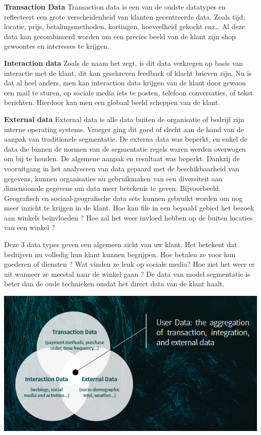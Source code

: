 \textbf{Transaction Data} \newline
Transaction data is een van de oudste datatypes en reflecteert een grote verscheidenheid van klanten gecentreerde data. Zoals tijd, locatie, prijs, betalingsmethoden, kortingen, hoeveelheid gekocht enz… Al deze data kan gecombineerd worden om een precies beeld van de klant zijn shop gewoontes en interesses te krijgen.

\textbf{Interaction data} \newline
Zoals de naam het zegt, is dit data verkregen op basis van interactie met de klant, dit kan geschreven feedback of klacht brieven zijn. Nu is dat al heel anders, men kan interaction data krijgen van de klant door gewoon een mail te sturen, op sociale media iets te posten, telefoon conversaties, of tekst berichten. Hierdoor kan men een globaal beeld scheppen van de klant.

\textbf{External data}
External data is alle data buiten de organisatie of bedrijf zijn interne operating systems. Vroeger ging dit goed of slecht aan de hand van de aanpak van  traditionele segmentatie. De externa data was beperkt, en enkel de data die binnen de normen van de segmentatie regels waren werden overwogen om bij te houden. De algemene aanpak en resultaat was beperkt. Dankzij de vooruitgang in het analyseren van data gepaard met de beschikbaarheid van gegevens, kunnen organisaties nu gebruikmaken van een diversiteit aan dimensionale gegevens om data meer betekenis te geven. Bijvoorbeeld. Geografisch en sociaal-geografische data sets kunnen gebruikt worden om nog meer inzicht te krijgen in de klant. Hoe kan file in een bepaald gebied het bezoek aan winkels beïnvloeden ? Hoe zal het weer invloed hebben op de buiten locaties van een winkel ? 


Deze 3 data types geven een algemeen zicht van uw klant. Het betekent dat bedrijven nu volledig hun klant kunnen begrijpen. Hoe betalen ze voor hun goederen of diensten ? Wat vinden ze leuk op sociale media? Hoe ziet het weer er uit wanneer ze meestal naar de winkel gaan ? De data van model segmentatie is beter dan de oude technieken omdat het direct data van de klant haalt. 

\includegraphics[scale=0.9]{img/modelbased-data}

